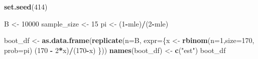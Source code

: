 \documentclass[
  11pt,
]{article}
\newenvironment{Shaded}{\begin{snugshade}}{\end{snugshade}}
\newcommand{\AttributeTok}[1]{\textcolor[rgb]{0.13,0.29,0.53}{#1}}
\newcommand{\DecValTok}[1]{\textcolor[rgb]{0.00,0.00,0.81}{#1}}
\newcommand{\FunctionTok}[1]{\textcolor[rgb]{0.13,0.29,0.53}{\textbf{#1}}}
\newcommand{\NormalTok}[1]{#1}
\newcommand{\OtherTok}[1]{\textcolor[rgb]{0.56,0.35,0.01}{#1}}
\newcommand{\SpecialCharTok}[1]{\textcolor[rgb]{0.81,0.36,0.00}{\textbf{#1}}}
\newcommand{\StringTok}[1]{\textcolor[rgb]{0.31,0.60,0.02}{#1}}
\begin{document}
\begin{Shaded}
\begin{Highlighting}[]
\FunctionTok{set.seed}\NormalTok{(}\DecValTok{414}\NormalTok{)}

\NormalTok{B }\OtherTok{\textless{}{-}} \DecValTok{10000}
\NormalTok{sample\_size }\OtherTok{\textless{}{-}} \DecValTok{15}
\NormalTok{pi }\OtherTok{\textless{}{-}}\NormalTok{ (}\DecValTok{1}\SpecialCharTok{{-}}\NormalTok{mle)}\SpecialCharTok{/}\NormalTok{(}\DecValTok{2}\SpecialCharTok{{-}}\NormalTok{mle)}

\NormalTok{boot\_df }\OtherTok{\textless{}{-}} \FunctionTok{as.data.frame}\NormalTok{(}\FunctionTok{replicate}\NormalTok{(}\AttributeTok{n=}\NormalTok{B, }\AttributeTok{expr=}\NormalTok{\{x }\OtherTok{\textless{}{-}} \FunctionTok{rbinom}\NormalTok{(}\AttributeTok{n=}\DecValTok{1}\NormalTok{,}\AttributeTok{size=}\DecValTok{170}\NormalTok{, }\AttributeTok{prob=}\NormalTok{pi)}
\NormalTok{                     (}\DecValTok{170} \SpecialCharTok{{-}} \DecValTok{2}\SpecialCharTok{*}\NormalTok{x)}\SpecialCharTok{/}\NormalTok{(}\DecValTok{170}\SpecialCharTok{{-}}\NormalTok{x)}
\NormalTok{                    \}))}
\FunctionTok{names}\NormalTok{(boot\_df) }\OtherTok{\textless{}{-}} \FunctionTok{c}\NormalTok{(}\StringTok{"est"}\NormalTok{)}
\NormalTok{boot\_df}
\end{Highlighting}
\end{Shaded}
\end{document}
